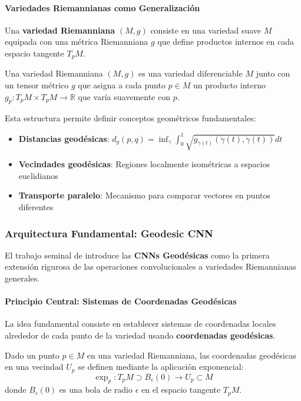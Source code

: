 \paragraph{Variedades Riemannianas como Generalización}

Una \textbf{variedad Riemanniana} $(M, g)$ consiste en una variedad suave $M$ equipada con una métrica Riemanniana $g$ que define productos internos en cada espacio tangente $T_p M$.

\begin{definition}
Una variedad Riemanniana $(M, g)$ es una variedad diferenciable $M$ junto con un tensor métrico $g$ que asigna a cada punto $p \in M$ un producto interno $g_p: T_p M \times T_p M \to \mathbb{R}$ que varía suavemente con $p$.
\end{definition}

Esta estructura permite definir conceptos geométricos fundamentales:
\begin{itemize}
    \item \textbf{Distancias geodésicas}: $d_g(p,q) = \inf_{\gamma} \int_0^1 \sqrt{g_{\gamma(t)}(\dot{\gamma}(t), \dot{\gamma}(t))} dt$
    \item \textbf{Vecindades geodésicas}: Regiones localmente isométricas a espacios euclidianos
    \item \textbf{Transporte paralelo}: Mecanismo para comparar vectores en puntos diferentes
\end{itemize}

\subsubsection{Arquitectura Fundamental: Geodesic CNN}

El trabajo seminal de \citet{masci2018geodesicconvolutionalneural} introduce las \textbf{CNNs Geodésicas} como la primera extensión rigurosa de las operaciones convolucionales a variedades Riemannianas generales.

\paragraph{Principio Central: Sistemas de Coordenadas Geodésicas}

La idea fundamental consiste en establecer sistemas de coordenadas locales alrededor de cada punto de la variedad usando \textbf{coordenadas geodésicas}.

\begin{definition}
Dado un punto $p \in M$ en una variedad Riemanniana, las coordenadas geodésicas en una vecindad $U_p$ se definen mediante la aplicación exponencial:
\begin{equation}
\exp_p: T_p M \supset B_\epsilon(0) \to U_p \subset M
\end{equation}
donde $B_\epsilon(0)$ es una bola de radio $\epsilon$ en el espacio tangente $T_p M$.
\end{definition}

